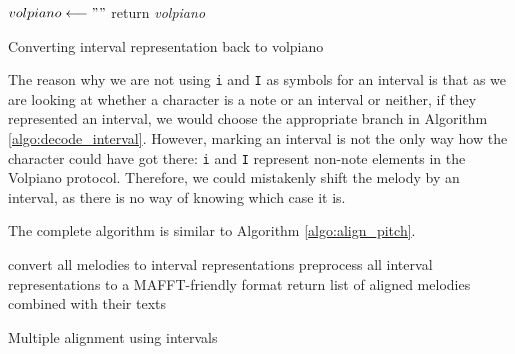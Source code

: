 \begin{algorithm}[H]
    \BlankLine
    $volpiano \longleftarrow ""$\;
    return \emph{volpiano}\;
    \caption{Converting interval representation back to volpiano}
    \label{algo:decode_interval}
\end{algorithm}

The reason why we are not using \verb|i| and \verb|I| as symbols for an interval is that as we are looking at whether a character is a note or an interval or neither, 
if they represented an interval, we would choose the appropriate branch in Algorithm \ref{algo:decode_interval}. However, marking an interval is not the only way how
the character could have got there: \verb|i| and \verb|I| represent non-note elements in the Volpiano protocol. Therefore, we could mistakenly shift the melody by an interval,
as there is no way of knowing which case it is.

The complete algorithm is similar to Algorithm \ref{algo:align_pitch}.\newline

\begin{algorithm}[H]
    \BlankLine
    convert all melodies to interval representations\;
    preprocess all interval representations to a MAFFT-friendly format\;
    return list of aligned melodies combined with their texts\;
    \caption{Multiple alignment using intervals}
    \label{algo:align_intervals}
\end{algorithm}
